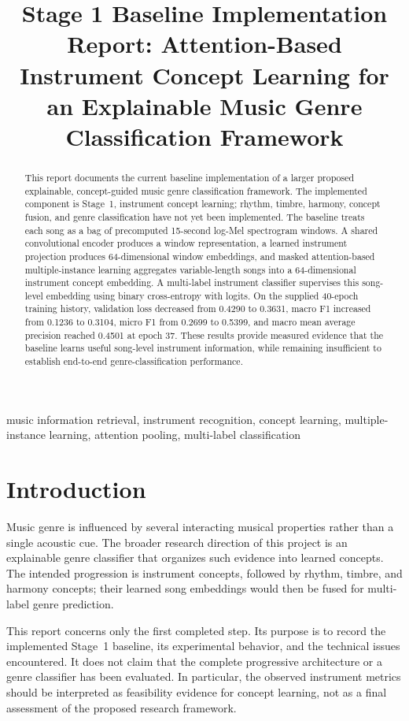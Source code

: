 \documentclass[conference]{IEEEtran}
\title{Stage 1 Baseline Implementation Report: Attention-Based Instrument Concept Learning for an Explainable Music Genre Classification Framework}
\author{\IEEEauthorblockN{Author Name}\IEEEauthorblockA{Department / University\\City, Country\\author.email@university.edu}}
\begin{document}
\maketitle

\begin{abstract}
This report documents the current baseline implementation of a larger proposed explainable, concept-guided music genre classification framework. The implemented component is Stage~1, instrument concept learning; rhythm, timbre, harmony, concept fusion, and genre classification have not yet been implemented. The baseline treats each song as a bag of precomputed 15-second log-Mel spectrogram windows. A shared convolutional encoder produces a window representation, a learned instrument projection produces 64-dimensional window embeddings, and masked attention-based multiple-instance learning aggregates variable-length songs into a 64-dimensional instrument concept embedding. A multi-label instrument classifier supervises this song-level embedding using binary cross-entropy with logits. On the supplied 40-epoch training history, validation loss decreased from 0.4290 to 0.3631, macro F1 increased from 0.1236 to 0.3104, micro F1 from 0.2699 to 0.5399, and macro mean average precision reached 0.4501 at epoch 37. These results provide measured evidence that the baseline learns useful song-level instrument information, while remaining insufficient to establish end-to-end genre-classification performance.
\end{abstract}

\begin{IEEEkeywords}
music information retrieval, instrument recognition, concept learning, multiple-instance learning, attention pooling, multi-label classification
\end{IEEEkeywords}

\section{Introduction}
Music genre is influenced by several interacting musical properties rather than a single acoustic cue. The broader research direction of this project is an explainable genre classifier that organizes such evidence into learned concepts. The intended progression is instrument concepts, followed by rhythm, timbre, and harmony concepts; their learned song embeddings would then be fused for multi-label genre prediction.

This report concerns only the first completed step. Its purpose is to record the implemented Stage~1 baseline, its experimental behavior, and the technical issues encountered. It does not claim that the complete progressive architecture or a genre classifier has been evaluated. In particular, the observed instrument metrics should be interpreted as feasibility evidence for concept learning, not as a final assessment of the proposed research framework.
\end{document}
